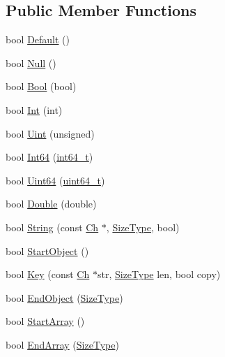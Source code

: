 \subsection*{Public Member Functions}
\begin{DoxyCompactItemize}
\item 
bool \hyperlink{structBaseReaderHandler_a836437f6ccc37f08ff933f009b18a78c}{Default} ()
\item 
bool \hyperlink{structBaseReaderHandler_ae2ebbde4628bf3659ddc5d18520935f5}{Null} ()
\item 
bool \hyperlink{structBaseReaderHandler_aa1c3ce42dbb856b3349792dc9d963587}{Bool} (bool)
\item 
bool \hyperlink{structBaseReaderHandler_a85e813aaf7189a2f87bd53953324fafc}{Int} (int)
\item 
bool \hyperlink{structBaseReaderHandler_a0e683306cbb7b4e350a35c18c5246f2a}{Uint} (unsigned)
\item 
bool \hyperlink{structBaseReaderHandler_a04011733ea584739c97ad5c6afa15a35}{Int64} (\hyperlink{stdint_8h_a414156feea104f8f75b4ed9e3121b2f6}{int64\+\_\+t})
\item 
bool \hyperlink{structBaseReaderHandler_a351aa3cd81856a487c21022e9cc64d2b}{Uint64} (\hyperlink{stdint_8h_aec6fcb673ff035718c238c8c9d544c47}{uint64\+\_\+t})
\item 
bool \hyperlink{structBaseReaderHandler_a8156ea6ae5b8cd23a8b700e92a8af1eb}{Double} (double)
\item 
bool \hyperlink{structBaseReaderHandler_a3ac69e6326d0aeef7b1f2619742bbe00}{String} (const \hyperlink{structBaseReaderHandler_a8302c755dd3560c8c5bac99162c28214}{Ch} $\ast$, \hyperlink{rapidjson_8h_a5ed6e6e67250fadbd041127e6386dcb5}{Size\+Type}, bool)
\item 
bool \hyperlink{structBaseReaderHandler_ab0a7d9bcececb8d6ed748656f67f4917}{Start\+Object} ()
\item 
bool \hyperlink{structBaseReaderHandler_abc50b2e7e411b7b731715e05cd01e2eb}{Key} (const \hyperlink{structBaseReaderHandler_a8302c755dd3560c8c5bac99162c28214}{Ch} $\ast$str, \hyperlink{rapidjson_8h_a5ed6e6e67250fadbd041127e6386dcb5}{Size\+Type} len, bool copy)
\item 
bool \hyperlink{structBaseReaderHandler_a0406cee0af26bc3a0b7fb2414537b0ab}{End\+Object} (\hyperlink{rapidjson_8h_a5ed6e6e67250fadbd041127e6386dcb5}{Size\+Type})
\item 
bool \hyperlink{structBaseReaderHandler_a9dbb1143a250a904bb18a174553a3a00}{Start\+Array} ()
\item 
bool \hyperlink{structBaseReaderHandler_ae9d60a8779b6a77a7f283d64961879fb}{End\+Array} (\hyperlink{rapidjson_8h_a5ed6e6e67250fadbd041127e6386dcb5}{Size\+Type})
\end{DoxyCompactItemize}



